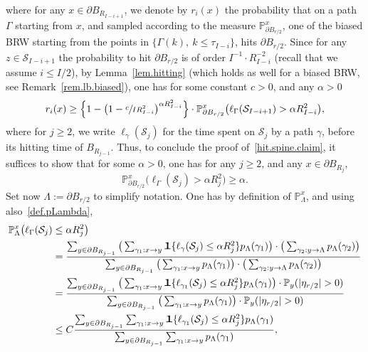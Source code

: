 \documentclass[JEP,XML,SOM,Unicode,NoFloatCountersInSection,published]{cedram}
\theoremstyle{plain}
\theoremstyle{definition}
\newcommand\cS{\mathcal{S}}
\newcommand{\1}{{\text{\Large $\mathfrak 1$}}}
\begin{document}
where for any $x\in \partial B_{R_{I-i+1}}$, we denote by $r_i(x)$ the probability that on a path $\Gamma$ starting from $x$,
and sampled according to the measure $\mathbb P^x_{\partial B_{r/2}}$, one of the biased BRW starting from the points in $\{\Gamma(k),\ k\le \tau_{I-i}\}$, hits
$\partial B_{r/2}$.
Since for any $z\in \mathcal S_{I-i+1}$ the probability
to hit $\partial B_{r/2}$ is of order $I^{-1}\cdot R_{I-i}^{-2}$
(recall that we assume $i\le I/2$), by Lemma~\ref{lem.hitting} (which holds as well for a biased BRW, see Remark~\ref{rem.lb.biased}), one has for some constant $c>0$, and any $\alpha>0$
\[
r_i(x) \ge \Big\{1 - \big(1-\sfrac{c}{IR_{I-i}^2}\big)^{\alpha R_{I-i}^2}\Big\} \cdot \mathbb P_{\partial B_{r/2}}^x\big(\ell_\Gamma(\cS_{I-i+1})
> \alpha R_{I-i}^2\big),
\]
where for $j\ge 2$, we write $\ell_\gamma(\cS_j)$
for the time spent on $\mathcal S_j$ by a path $\gamma$, before its hitting time of $B_{R_{j-1}}$.
Thus, to conclude the proof of~\eqref{hit.spine.claim}, it suffices to show that for some $\alpha>0$, one has for any $j\ge 2$, and any
$x\in \partial B_{R_j}$,
\begin{equation}\label{elljGamma}
\mathbb P_{\partial B_{r/2}}^x\big(\ell_\Gamma(\cS_j) > \alpha R_j^2\big) \ge \alpha.
\end{equation}
Set now $\Lambda:=\partial B_{r/2}$ to simplify notation. One has by definition of $\mathbb P_\Lambda^x$, and using also~\eqref{def.pLambda},
\begin{align*}
\mathbb P_\Lambda^x\big(\ell_\Gamma(\cS_j)&\le \alpha R_j^2\big)\\
& = \frac{\sum_{y\in \partial B_{R_{j-1}}} \big(\sum_{\gamma_1:x \to y}
\1\{\ell_\gamma(\cS_j)\le \alpha R_j^2\}
p_\Lambda(\gamma_1)\big)\cdot \big(\sum_{\gamma_2:y\to \Lambda} p_\Lambda(\gamma_2)\big)}
{\sum_{y\in \partial B_{R_{j-1}}} \big(\sum_{\gamma_1:x \to y} p_\Lambda(\gamma_1)\big)\cdot \big(\sum_{\gamma_2:y\to \Lambda} p_\Lambda(\gamma_2)\big)}\\
& = \frac{\sum_{y\in \partial B_{R_{j-1}}} \big(\sum_{\gamma_1:x \to y}
\1\{\ell_{\gamma_1}(\cS_j)\le \alpha R_j^2\} p_\Lambda(\gamma_1)\big)\cdot
\mathbb P_y(|\eta_{r/2}|>0)}
{\sum_{y\in \partial B_{R_{j-1}}}
\big(\sum_{\gamma_1:x \to y} p_\Lambda(\gamma_1)\big)\cdot \mathbb P_y(|\eta_{r/2}|>0)}\\
& \le C \frac{\sum_{y\in \partial B_{R_{j-1}}} \sum_{\gamma_1:x \to y}
\1\{\ell_{\gamma_1}(\cS_j)\le \alpha R_j^2\} p_\Lambda(\gamma_1)}
{\sum_{y\in \partial B_{R_{j-1}}}
\sum_{\gamma_1:x \to y} p_\Lambda(\gamma_1)},
\end{align*}
\end{document}

